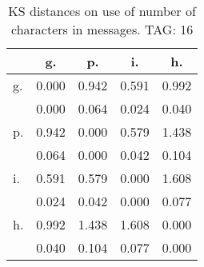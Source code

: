 \begin{table}[h!]
\begin{center}
\begin{tabular}{| l | c | c | c | c |}\hline
 & g. & p. & i. & h. \\\hline
g. & 0.000  & 0.942  & 0.591  & 0.992 \\\hline
 & 0.000  & 0.064  & 0.024  & 0.040 \\\hline
p. & 0.942  & 0.000  & 0.579  & 1.438 \\\hline
 & 0.064  & 0.000  & 0.042  & 0.104 \\\hline
i. & 0.591  & 0.579  & 0.000  & 1.608 \\\hline
 & 0.024  & 0.042  & 0.000  & 0.077 \\\hline
h. & 0.992  & 1.438  & 1.608  & 0.000 \\\hline
 & 0.040  & 0.104  & 0.077  & 0.000 \\\hline
\end{tabular}
\caption{KS distances on use of number of characters in messages. TAG: 16}
\end{center}
\end{table}